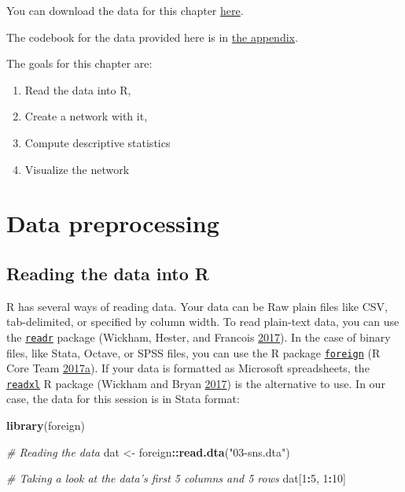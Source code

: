 \documentclass[]{book}
\newenvironment{Shaded}{\begin{snugshade}}{\end{snugshade}}
\newcommand{\CommentTok}[1]{\textcolor[rgb]{0.56,0.35,0.01}{\textit{#1}}}
\newcommand{\DecValTok}[1]{\textcolor[rgb]{0.00,0.00,0.81}{#1}}
\newcommand{\KeywordTok}[1]{\textcolor[rgb]{0.13,0.29,0.53}{\textbf{#1}}}
\newcommand{\NormalTok}[1]{#1}
\newcommand{\OperatorTok}[1]{\textcolor[rgb]{0.81,0.36,0.00}{\textbf{#1}}}
\newcommand{\StringTok}[1]{\textcolor[rgb]{0.31,0.60,0.02}{#1}}
\begin{document}
You can download the data for this chapter \href{https://cdn.rawgit.com/gvegayon/appliedsnar/fdc0d26f/03-sns.dta}{here}.

The codebook for the data provided here is in \protect\hyperlink{sns-data}{the appendix}.

The goals for this chapter are:

\begin{enumerate}
\def\labelenumi{\arabic{enumi}.}
\item
  Read the data into R,
\item
  Create a network with it,
\item
  Compute descriptive statistics
\item
  Visualize the network
\end{enumerate}

\hypertarget{data-preprocessing}{%
\section{Data preprocessing}\label{data-preprocessing}}

\hypertarget{reading-the-data-into-r}{%
\subsection{Reading the data into R}\label{reading-the-data-into-r}}

R has several ways of reading data. Your data can be Raw plain files like CSV, tab-delimited, or specified by column width. To read plain-text data, you can use the \href{https://cran.r-project.org/package=readr}{\texttt{readr}} package (Wickham, Hester, and Francois \protect\hyperlink{ref-R-readr}{2017}). In the case of binary files, like Stata, Octave, or SPSS files, you can use the R package \href{https://cran.r-project.org/package=readr}{\texttt{foreign}} (R Core Team \protect\hyperlink{ref-R-foreign}{2017}\protect\hyperlink{ref-R-foreign}{a}). If your data is formatted as Microsoft spreadsheets, the \href{https://cran.r-project.org/package=readxl}{\texttt{readxl}} R package (Wickham and Bryan \protect\hyperlink{ref-R-readxl}{2017}) is the alternative to use. In our case, the data for this session is in Stata format:

\begin{Shaded}
\begin{Highlighting}[]
\KeywordTok{library}\NormalTok{(foreign)}

\CommentTok{# Reading the data}
\NormalTok{dat <-}\StringTok{ }\NormalTok{foreign}\OperatorTok{::}\KeywordTok{read.dta}\NormalTok{(}\StringTok{"03-sns.dta"}\NormalTok{)}

\CommentTok{# Taking a look at the data's first 5 columns and 5 rows}
\NormalTok{dat[}\DecValTok{1}\OperatorTok{:}\DecValTok{5}\NormalTok{, }\DecValTok{1}\OperatorTok{:}\DecValTok{10}\NormalTok{]}
\end{Highlighting}
\end{Shaded}
\end{document}
